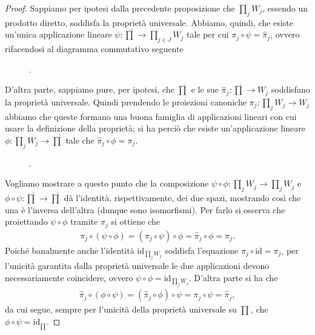 \begin{proof}
    Sappiamo per ipotesi dalla precedente proposizione che $\prod_{j} W_j$, essendo un prodotto diretto, soddisfa la proprietà universale. Abbiamo, quindi, che esiste un'unica applicazione lineare $\psi: \hat{\prod} \to \prod_{j \in J} W_j$ tale per cui $\pi_j \circ \psi = \hat{\pi}_j$, ovvero rifacendosi al diagramma commutativo seguente
    \begin{figure}[H]
        \centering
        .
    \end{figure}
    D'altra parte, sappiamo pure, per ipotesi, che $\hat{\prod}$ e le sue $\hat{\pi}_j : \hat{\prod} \to W_j$ soddisfano la proprietà universale. Quindi prendendo le proiezioni canoniche $\pi_j : \prod_j W_j \to W_j$ abbiamo che queste formano una buona famiglia di applicazioni lineari con cui usare la definizione della proprietà; si ha perciò che esiste un'applicazione lineare $\phi: \prod_j W_j \to \hat{\prod}$ tale che $\hat{\pi}_j \circ \phi = \pi_j$.
    \begin{figure}[H]
        \centering
        .
    \end{figure}
    Vogliamo mostrare a questo punto che la composizione $\psi \circ \phi: \prod_j W_j \to \prod_j W_j$ e $\phi \circ \psi: \hat{\prod} \to \hat{\prod}$ dà l'identità, rispettivamente, dei due spazi, mostrando così che una è l'inversa dell'altra (dunque sono isomorfismi). Per farlo si osserva che proiettando $\psi \circ \phi$ tramite $\pi_j$ si ottiene che
    \begin{align}
        \pi_j \circ (\psi \circ \phi) = (\pi_j \circ \psi) \circ \phi = \hat{\pi}_j \circ \phi = \pi_j.
    \end{align}
    Poiché banalmente anche l'identità $\text{id}_{\prod_j W_j}$ soddisfa l'equazione $\pi_j \circ \text{id} = \pi_j$, per l'unicità garantita dalla proprietà universale le due applicazioni devono necessariamente coincidere, ovvero $\psi \circ \phi = \text{id}_{\prod_j W_j}$. D'altra parte si ha che
    \begin{align}
        \hat{\pi}_j \circ (\phi \circ \psi) = (\hat{\pi}_j \circ \phi) \circ \psi = \pi_j \circ \psi = \hat{\pi}_j,
    \end{align}
    da cui segue, sempre per l'unicità della proprietà universale su $\hat{\prod}$, che $\phi \circ \psi = \text{id}_{\hat{\prod}}$.
\end{proof}